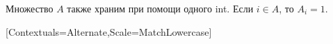 Множество $A$ также храним при помощи одного int. Если $i ∈ A$, то $A_i = 1$.
\begin{multicols*}{2}
    \setlength{\columnseprule}{0.2pt}
    \setmonofont{Fira Code}[Contextuals=Alternate,Scale=MatchLowercase]
    \fontsize{9pt}{10pt}

    \makeatletter
        \let\FV@ListProcessLine@NoBreak@Orig\FV@ListProcessLine@NoBreak
        \let\FV@ListProcessLine@Break@Orig\FV@ListProcessLine@Break
        \def\FV@ListProcessLine@NoBreak#1{%
          \ifx\FV@Line\empty
            \hbox{}\vspace{\dimexpr-\baselineskip+5pt}%
          \else
            \FV@ListProcessLine@NoBreak@Orig{#1}%
          \fi}
        \def\FV@ListProcessLine@Break#1{%
          \ifx\FV@Line\empty
            \hbox{}\vspace{\dimexpr-\baselineskip+5pt}%
          \else
            \FV@ListProcessLine@Break@Orig{#1}%
          \fi}
    \makeatother
    \inputminted[mathescape,breaklines,python3,tabsize=2]{python}{ReedMuller.py}
\end{multicols*}
\restoregeometry
